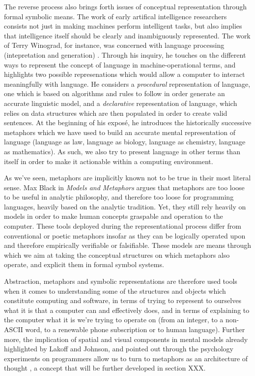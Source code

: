 The reverse process also brings forth issues of conceptual representation through formal symbolic means. The work of early artifical intelligence researchers consists not just in making machines perform intelligent tasks, but also implies that intelligence itself should be clearly and inambiguously represented. The work of Terry Winograd, for instance, was concerned with language processing (intepretation and generation) \citep{winograd_language_1982}. Through his inquiry, he touches on the different ways to represent the concept of language in machine-operational terms, and highlights two possible represenations which would allow a computer to interact meaningfully with language. He considers a \emph{procedural} representation of language, one which is based on algorithms and rules to follow in order generate an accurate linguistic model, and a \emph{declarative} representation of language, which relies on data structures which are then populated in order to create valid sentences. At the beginning of his exposé, he introduces the historically successive metaphors which we have used to build an accurate mental representation of language (language as law, language as biology, language as chemistry, language as mathematics). As such, we also try to present language in other terms than itself in order to make it actionable within a computing environment.

As we've seen, metaphors are implicitly known not to be true in their most literal sense. Max Black in \emph{Models and Metaphors} argues that metaphors are too loose to be useful in analytic philosophy, and therefore too loose for programming languages, heavily based on the analytic tradition. Yet, they still rely heavily on models in order to make human concepts graspable and operation to the computer. These tools deployed during the representational process differ from conventional or poetic metaphors insofar as they can be logically operated upon and therefore empirically verifiable or falsifiable. These models are means through which we aim at taking the conceptual structures on which metaphors also operate, and explicit them in formal symbol systems.

Abstraction, metaphors and symbolic representations are therefore used tools when it comes to understanding some of the structures and objects which constitute computing and software, in terms of trying to represent to ourselves what it is that a computer can and effectively does, and in terms of explaining to the computer what it is we're trying to operate on (from an integer, to a non-ASCII word, to a renewable phone subscription or to human language). Further more, the implication of spatial and visual components in mental models already highlighted by Lakoff and Johnson, and pointed out through the psychology experiments on programmers allow us to turn to metaphors as an architecture of thought \citep{forsythe_cathedrals_1986}, a concept that will be further developed in section XXX.

